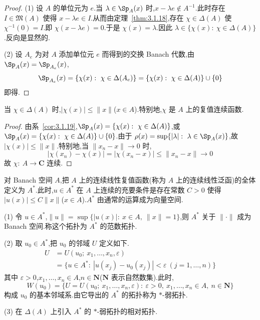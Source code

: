 \begin{proof}
(1) 设 $A$ 的单位元为 $e$.当 $\lambda \in \Sp_{A}(x)$ 时,$x - \lambda e \notin A^{-1}$.此时存在 $I \in \mathfrak{M}(A)$ 使得 $x - \lambda e \in I$.从而由定理~\ref{thm:3.1.18},存在 $\chi \in \Delta(A)$ 使 $\chi^{-1}(0) = I$.即 $\chi(x - \lambda e) = 0$.于是 $\chi(x) = \lambda$.因此 $\lambda \in \{\chi(x):\ \chi \in \Delta(A)\}$.反向是显然的.

(2) 设 $A_{e}$ 为对 $A$ 添加单位元 $e$ 而得到的交换 Banach 代数,由 $\Sp_{A}(x) = \Sp_{A_{e}}(x)$,
\begin{equation*}
\Sp_{A_{e}}(x) = \{\chi(x):\ \chi \in \Delta(A_{e})\} = \{\chi(x):\ \chi \in \Delta(A)\} \cup \{0\}
\end{equation*}
即得.
\end{proof}

\begin{corollary}\label{cor:3.1.20}
当 $\chi \in \Delta(A)$ 时,$|\chi(x)| \leq \|x\|$($x \in A$).特别地,$\chi$ 是 $A$ 上的复值连续函数.
\end{corollary}

\begin{proof}
由系~\ref{cor:3.1.19},$\Sp_{A}(x) = \{\chi(x):\ \chi \in \Delta(A)\}$,或 $\Sp_{A}(x) = \{\chi(x):\ \chi \in \Delta(A)\} \cup \{0\}$.由于 $\rho(x) = \sup\{|\lambda|:\ \lambda \in \Sp_{A}(x)\}$,故 $|\chi(x)| \leq \|x\|$.特别地,当 $\|x_{n} - x\| \to 0$ 时,
\begin{equation*}
|\chi(x_{n}) - \chi(x)| = |\chi(x_{n} - x)| \leq \|x_{n} - x\| \to 0
\end{equation*}
故 $\chi:\ A \to \mathbf{C}$ 连续.
\end{proof}

\begin{definition}\label{def:3.1.21}
对 Banach 空间 $A$,把 $A$ 上的连续线性复值函数(称为 $A$ 上的连续线性泛函)的全体定义为 $A^{*}$.此时,$u \in A^{*}$ 在 $A$ 上连续的充要条件是存在常数 $C > 0$ 使得 $|u(x)| \leq C\|x\|$($x \in A$).$A^{*}$ 由通常的运算成为向量空间.
\end{definition}

\begin{definition}\label{def:3.1.22}

(1) 令 $u \in A^{*}$,$\|u\| = \sup\{|u(x)|:\ x \in A,\ \|x\| = 1\}$,则 $A^{*}$ 关于 $\|\cdot\|$ 成为 Banach 空间.称这个拓扑为 $A^{*}$ 的范数拓扑.

(2) 取 $u_{0} \in A^{*}$,把 $u_{0}$ 的邻域 $U$ 定义如下.
\begin{align*}
U &= U(u_{0};\ x_{1}, \ldots, x_{n}, \varepsilon) \\
&= \{u \in A^{*}:\ |u(x_{j}) - u_{0}(x_{j})| < \varepsilon\ (j = 1, \ldots, n)\}
\end{align*}
其中 $\varepsilon > 0$,$x_{1}, \ldots, x_{n} \in A$,$n \in \mathbf{N}$($\mathbf{N}$ 表示自然数集).此时,
\begin{equation*}
W(u_{0}) = \{U = U(u_{0};\ x_{1}, \ldots, x_{n}, \varepsilon):\ \varepsilon > 0,\ x_{1}, \ldots, x_{n} \in A,\ n \in \mathbf{N}\}
\end{equation*}
构成 $u_{0}$ 的基本邻域系.由它导出的 $A^{*}$ 的拓扑称为 $*$-弱拓扑.

(3) 在 $\Delta(A)$ 上引入 $A^{*}$ 的 $*$-弱拓扑的相对拓扑.
\end{definition}

